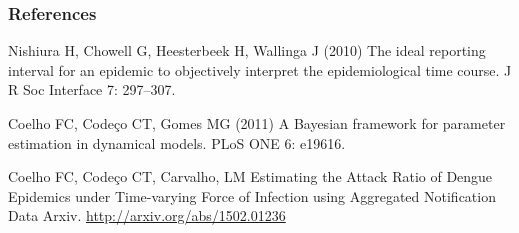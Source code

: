 \documentclass[10pt,compress,notheorems]{beamer}
\begin{document}
\begin{frame}[fragile]
\frametitle{References}
\begin{thebibliography}{10}
Nishiura H, Chowell G, Heesterbeek H, Wallinga J (2010) {{T}he ideal reporting
  interval for an epidemic to objectively interpret the epidemiological time
  course}.
\newblock J R Soc Interface 7: 297--307.

Coelho FC, Code\c{c}o CT, Gomes MG (2011) {A} {B}ayesian framework for
  parameter estimation in dynamical models.
\newblock PLoS ONE 6: e19616.

Coelho FC, Code\c{c}o CT, Carvalho, LM {E}stimating the Attack Ratio of Dengue 
Epidemics under Time-varying Force of Infection using Aggregated Notification 
Data
\newblock Arxiv. \url{http://arxiv.org/abs/1502.01236}
\end{thebibliography}

\end{frame}
\end{document}
